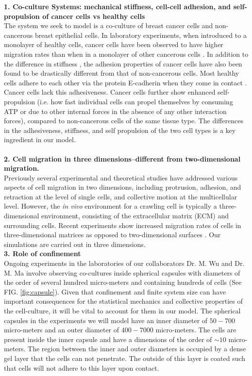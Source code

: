\documentclass[aps,prb,twocolumn,groupedaddress,nofootinbib,floatfix]{revtex4}
\begin{document}
{\bf 1. Co-culture Systems: mechanical stiffness, cell-cell adhesion, and self-propulsion of cancer cells vs healthy cells}\\
The system we seek to model is a co-culture of breast cancer cells and non-cancerous breast epithelial cells. 
In laboratory experiments, when introduced to a monolayer of healthy cells, cancer cells have been observed to have higher migration rates than when in a monolayer of other cancerous cells \cite{Lee}.
In addition to the difference in stiffness \cite{Lee}, the adhesion properties of cancer cells have also been found to be drastically different from that of non-cancerous cells\cite{Jeanes}.
Most healthy cells adhere to each other via the protein E-cadherin when they come in contact \cite{Suresh}. Cancer cells lack this adhesiveness. Cancer cells further show enhanced self-propulsion (i.e. how fast individual cells can propel themselves by consuming ATP or due to other internal forces in the absence of any other 
interaction forces), compared to non-cancerous cells of the same tissue type. The differences in the adhesiveness, stiffness, and self propulsion of the two cell types is a key ingredient in our model.\\
\\

{\bf 2. Cell migration in three dimensions--different from two-dimensional migration.}\\
Previously several experimental and theoretical studies have addressed various aspects of cell migration in two dimensions, including protrusion, adhesion, and retraction at the level of single cells, and collective motion at the multicellular level.
However, the {\it in vivo} environment for a crawling cell is typically a three-dimensional environment, consisting of the extracellular matrix (ECM) and surrounding cells.
Recent experiments show increased migration rates of cells in three-dimensional matrices as opposed to  two-dimensional surfaces \cite{Cukierman}. Our simulations are carried out in three dimensions.\\ 

{\bf 3. Role of confinement}\\
Ongoing experiments in the laboratories of our collaborators Dr. M. Wu and Dr. M. Ma involve observing co-cultures inside spherical capsules with diameters of the order of several hundred micro-meters 
and containing hundreds of cells\cite{Alessandri} (See FIG. \ref{fig:capsule}). Given that confinement and finite system size can have important consequences for the statistical mechanics and collective 
properties of the cell-culture, it will be vital to account for them in our model. The spherical capsules in the experiments we will model have an inner diameter of $50-700$ micro-meters and an outer diameter of $400-7000$ micro-meters.
The cells are present inside the inner capsule and have a dimensions of the order of $\sim 10$ micro-meters. The region between the inner and outer diameters is occupied by a dense gel layer that the cells can not penetrate.
The outside of this layer is coated such that cells will not adhere to this layer upon contact. \\
\end{document}

